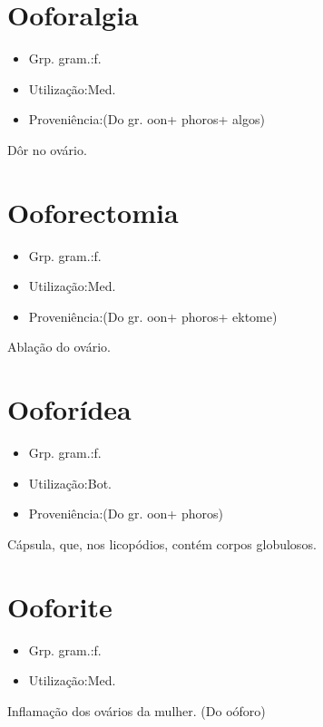 \section{Ooforalgia}
\begin{itemize}
\item {Grp. gram.:f.}
\end{itemize}
\begin{itemize}
\item {Utilização:Med.}
\end{itemize}
\begin{itemize}
\item {Proveniência:(Do gr. \textunderscore oon\textunderscore  + \textunderscore phoros\textunderscore  + \textunderscore algos\textunderscore )}
\end{itemize}
Dôr no ovário.
\section{Ooforectomia}
\begin{itemize}
\item {Grp. gram.:f.}
\end{itemize}
\begin{itemize}
\item {Utilização:Med.}
\end{itemize}
\begin{itemize}
\item {Proveniência:(Do gr. \textunderscore oon\textunderscore  + \textunderscore phoros\textunderscore  + \textunderscore ektome\textunderscore )}
\end{itemize}
Ablação do ovário.
\section{Ooforídea}
\begin{itemize}
\item {Grp. gram.:f.}
\end{itemize}
\begin{itemize}
\item {Utilização:Bot.}
\end{itemize}
\begin{itemize}
\item {Proveniência:(Do gr. \textunderscore oon\textunderscore  + \textunderscore phoros\textunderscore )}
\end{itemize}
Cápsula, que, nos licopódios, contém corpos globulosos.
\section{Ooforite}
\begin{itemize}
\item {Grp. gram.:f.}
\end{itemize}
\begin{itemize}
\item {Utilização:Med.}
\end{itemize}
Inflamação dos ovários da mulher.
(Do \textunderscore oóforo\textunderscore )
